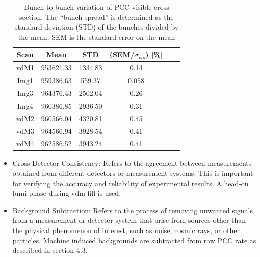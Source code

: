 \begin{itemize}
\begin{table}[h]
  \centering
  \caption[$\sigma_{vis}$ bunch variation uncertainty]{Bunch to bunch variation of PCC visible cross section. The “bunch spread” is determined as the standard deviation (STD) of the bunches divided by the mean. SEM is the standard error on the mean}
\begin{tabular}{cccccc}
\textbf{Scan} & \textbf{Mean} & \textbf{STD} & \textbf{(SEM/$\sigma_{vis}$) [\%]} \\
\hline
vdM1 & 953621.33 & 1334.83 & 0.14 \\
Img1 & 959386.63 & 559.37 & 0.058 \\
Img3 & 964376.43 & 2502.04 & 0.26 \\
Img4 & 960386.85 & 2936.50 & 0.31 \\
vdM2 & 960566.04 & 4320.81 & 0.45 \\
vdM3 & 964566.94 & 3928.54 & 0.41 \\
vdM4 & 962586.52 & 3943.24 & 0.41 \\
\end{tabular}
\label{tab:sigmavis_btob_values}
\end{table}

\item Cross-Detector Consistency: Refers to the agreement between measurements obtained from different detectors or measurement systems. This is important for verifying the accuracy and reliability of experimental results. A head-on lumi phase during vdm fill is used.

\item Background Subtraction: Refers to the process of removing unwanted signals from a measurement or detector system that arise from sources other than the physical phenomenon of interest, such as noise, cosmic rays, or other particles. Machine induced backgrounds are subtracted from raw PCC rate as described in section 4.3. %

\end{itemize}
